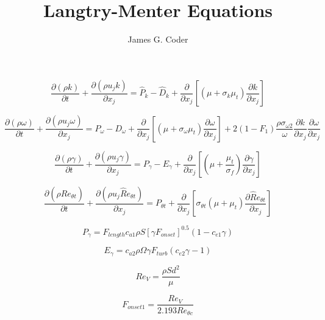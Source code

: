 \documentclass[8pt]{article}
\title{Langtry-Menter Equations}
\author{James G. Coder}
\begin{document}
\begin{equation}
   \frac{\partial \left( \rho k \right)}{\partial t} + \frac{\partial \left( \rho u_j k \right)}{\partial x_j} = \hat P_k - \hat D_k  + \frac{\partial}{\partial x_j} \left[ \left( \mu + \sigma_k \mu_t \right) \frac{\partial k}{\partial x_j} \right]
\end{equation}

\begin{equation}
   \frac{\partial \left( \rho \omega \right)}{\partial t} + \frac{\partial \left( \rho u_j \omega \right)}{\partial x_j} = P_{\omega} - D_{\omega}  + \frac{\partial}{\partial x_j} \left[ \left( \mu + \sigma_{\omega} \mu_t \right) \frac{\partial \omega}{\partial x_j} \right] + 2 \left( 1 - F_1 \right) \frac{\rho \sigma_{\omega 2}}{\omega} \frac{\partial k}{\partial x_j} \frac{ \partial \omega}{\partial x_j}
\end{equation}

\begin{equation}
   \frac{\partial \left( \rho \gamma \right)}{\partial t} + \frac{\partial \left( \rho u_j \gamma \right)}{\partial x_j} = P_\gamma - E_\gamma + \frac{\partial}{\partial x_j} \left[ \left( \mu + \frac{\mu_t}{\sigma_f} \right) \frac{\partial \gamma}{\partial x_j} \right]
\end{equation}

\begin{equation}
   \frac{\partial \left( \rho\hat Re_{\theta t} \right)}{\partial t} + \frac{\partial \left( \rho u_j \hat Re_{\theta t} \right)}{\partial x_j} = P_{\theta t} + \frac{\partial}{\partial x_j} \left[ \sigma_{\theta t} \left( \mu + \mu_t \right) \frac{\partial \hat Re_{\theta t}}{\partial x_j} \right]
\end{equation}

\begin{equation}
   P_\gamma = F_{length} c_{a1} \rho S \left[ \gamma F_{onset} \right] ^{0.5} \left( 1 - c_{e1} \gamma \right)
\end{equation}

\begin{equation}
   E_\gamma =c_{a2} \rho \Omega \gamma F_{turb} \left( c_{e2} \gamma - 1 \right)
\end{equation}

\begin{equation}
   Re_V = \frac{\rho S d^2}{\mu}
\end{equation}

\begin{equation}
   F_{onset1} = \frac{Re_V}{2.193 Re_{\theta c}}
\end{equation}
\end{document}
